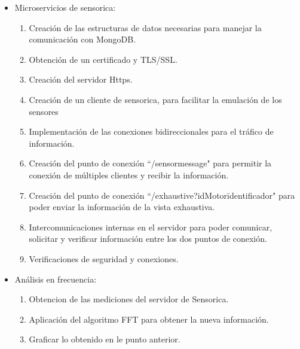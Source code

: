 \begin{itemize}
    \item Microservicios de sensorica:
        \begin{enumerate}
            \item Creación de las estructuras de datos necesarias para manejar
                la comunicación con MongoDB.
            \item Obtención de un certificado y TLS/SSL.
            \item Creación del servidor Https.
            \item Creación de un cliente de sensorica, para facilitar la emulación
                de los sensores
            \item Implementación de las conexiones bidireccionales para el tráfico
                de información.
            \item Creación del punto de conexión ``/sensormessage" para permitir
                la conexión de múltiples clientes y recibir la información.
            \item Creación del punto de conexión ``/exhaustive?idMotor\=identificador"
                para poder enviar la información de la vista exhaustiva.
            \item Intercomunicaciones internas en el servidor para poder comunicar,
                solicitar y verificar información entre los dos puntos de conexión.
            \item Verificaciones de seguridad y conexiones.
        \end{enumerate}

    \item Análisis en frecuencia:
        \begin{enumerate}
                \item Obtencion de las mediciones del servidor de Sensorica.
                \item Aplicación del algoritmo FFT para obtener la nueva
                    información.
                \item Graficar lo obtenido en le punto anterior.
        \end{enumerate}


\end{itemize}
